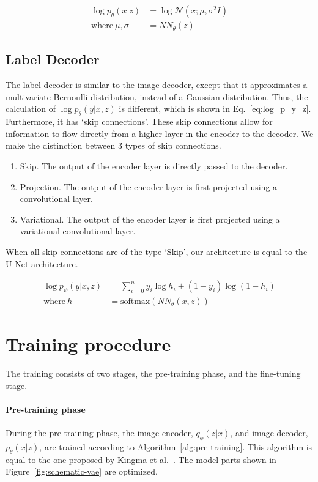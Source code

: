 \begin{equation}
    \begin{split}
        \log p_\theta(x|z)      & = \log \mathcal{N}(x; \mu, \sigma^2I) \label{eq:log_p_x_z} \\
        \text{where}~\mu,\sigma & =NN_\theta(z)
    \end{split}
\end{equation}

\subsection{Label Decoder}
The label decoder is similar to the image decoder, except that it approximates a multivariate Bernoulli distribution, instead of a Gaussian distribution. Thus, the calculation of $\log p_\theta(y|x,z)$ is different, which is shown in Eq.~\ref{eq:log_p_y_z}. Furthermore, it has `skip connections'. These skip connections allow for information to flow directly from a higher layer in the encoder to the decoder. We make the distinction between 3 types of skip connections.
\begin{enumerate}
    \item Skip. The output of the encoder layer is directly passed to the decoder.
    \item Projection. The output of the encoder layer is first projected using a convolutional layer.
    \item Variational. The output of the encoder layer is first projected using a variational convolutional layer.
\end{enumerate}
When all skip connections are of the type `Skip', our architecture is equal to the U-Net architecture.

\begin{subequations}
    \begin{align}
        \log p_\psi(y|x, z) & = \sum_{i=0}^n y_i \log h_i + (1 - y_i)\log(1-h_i) \label{eq:log_p_y_z} \\
        \text{where}~h      & = \text{softmax}(NN_\theta(x, z))
    \end{align}
\end{subequations}

\section{Training procedure}
The training consists of two stages, the pre-training phase, and the fine-tuning stage. 
\paragraph*{Pre-training phase} During the pre-training phase, the image encoder, $q_\phi(z|x)$, and image decoder, $p_\theta(x|z)$, are trained according to Algorithm~\ref{alg:pre-training}. This algorithm is equal to the one proposed by Kingma et al.~\cite{kingma2014autoencodingvariationalbayes}. The model parts shown in Figure~\ref{fig:schematic-vae} are optimized.

